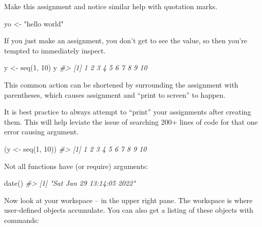 \documentclass[
]{book}
\newenvironment{Shaded}{\begin{snugshade}}{\end{snugshade}}
\newcommand{\CommentTok}[1]{\textcolor[rgb]{0.56,0.35,0.01}{\textit{#1}}}
\newcommand{\DecValTok}[1]{\textcolor[rgb]{0.00,0.00,0.81}{#1}}
\newcommand{\FunctionTok}[1]{\textcolor[rgb]{0.00,0.00,0.00}{#1}}
\newcommand{\NormalTok}[1]{#1}
\newcommand{\OtherTok}[1]{\textcolor[rgb]{0.56,0.35,0.01}{#1}}
\newcommand{\StringTok}[1]{\textcolor[rgb]{0.31,0.60,0.02}{#1}}
\begin{document}
Make this assignment and notice similar help with quotation marks.

\begin{Shaded}
\begin{Highlighting}[]
\NormalTok{yo }\OtherTok{\textless{}{-}} \StringTok{"hello world"}
\end{Highlighting}
\end{Shaded}

If you just make an assignment, you don't get to see the value, so then you're tempted to immediately inspect.

\begin{Shaded}
\begin{Highlighting}[]
\NormalTok{y }\OtherTok{\textless{}{-}} \FunctionTok{seq}\NormalTok{(}\DecValTok{1}\NormalTok{, }\DecValTok{10}\NormalTok{)}
\NormalTok{y}
\CommentTok{\#\textgreater{}  [1]  1  2  3  4  5  6  7  8  9 10}
\end{Highlighting}
\end{Shaded}

This common action can be shortened by surrounding the assignment with parentheses, which causes assignment and ``print to screen'' to happen.

It is best practice to always attempt to ``print'' your assignments after creating them. This will help leviate the issue of searching 200+ lines of code for that one error causing argument.

\begin{Shaded}
\begin{Highlighting}[]
\NormalTok{(y }\OtherTok{\textless{}{-}} \FunctionTok{seq}\NormalTok{(}\DecValTok{1}\NormalTok{, }\DecValTok{10}\NormalTok{))}
\CommentTok{\#\textgreater{}  [1]  1  2  3  4  5  6  7  8  9 10}
\end{Highlighting}
\end{Shaded}

Not all functions have (or require) arguments:

\begin{Shaded}
\begin{Highlighting}[]
\FunctionTok{date}\NormalTok{()}
\CommentTok{\#\textgreater{} [1] "Sat Jan 29 13:14:05 2022"}
\end{Highlighting}
\end{Shaded}

Now look at your workspace -- in the upper right pane. The workspace is where user-defined objects accumulate. You can also get a listing of these objects with commands:
\end{document}

